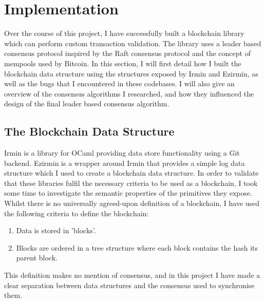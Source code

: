 \documentclass[12pt,a4paper,twoside,openright]{report}
\begin{document}
	\chapter{Implementation} \label{Implementation}
	Over the course of this project, I have successfully built a blockchain library which can perform custom transaction validation.
	The library uses a leader based consensus protocol inspired by the Raft consensus protocol and the concept of mempools used by Bitcoin.
	In this section, I will first detail how I built the blockchain data structure using the structures exposed by Irmin and Ezirmin, as well as the bugs that I encountered in these codebases.
	I will also give an overview of the consensus algorithms I researched, and how they influenced the design of the final leader based consensus algorithm.
	\section{The Blockchain Data Structure}
	Irmin is a library for OCaml providing data store functionality using a Git backend.
	Ezirmin is a wrapper around Irmin that provides a simple log data structure which I used to create a blockchain data structure.
	In order to validate that these libraries fulfil the necessary criteria to be used as a blockchain, I took some time to investigate the semantic properties of the primitives they expose. 
	Whilst there is no universally agreed-upon definition of a blockchain, I have used the following criteria to define the blockchain:
	\begin{enumerate}
		\item Data is stored in 'blocks'.
		\item Blocks are ordered in a tree structure where each block contains the hash its parent block.
	\end{enumerate}
	This definition makes no mention of consensus, and in this project I have made a clear separation between data structures and the consensus used to synchronise them.
\end{document}
